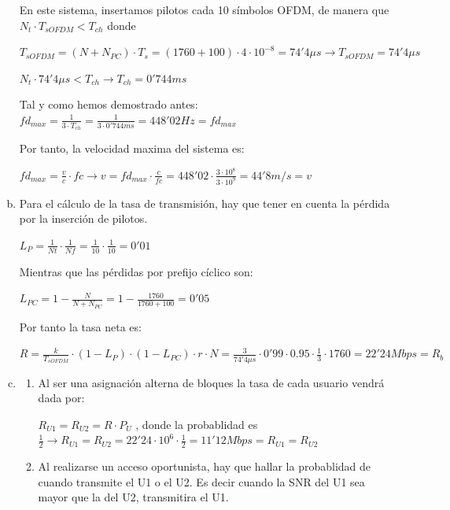 \documentclass[fleqn,14pt]{article}
\begin{document}
\begin{enumerate}[a)]
  En este sistema, insertamos pilotos cada 10 símbolos OFDM, de manera que $N_t \cdot T_{sOFDM} < T_{ch}$ donde

  $T_{sOFDM} = (N + N_{PC}) \cdot T_s = (1760 + 100) \cdot 4 \cdot 10^{-8} = 74'4 \mu s \rightarrow \boxed{T_{sOFDM} = 74'4 \mu s}$

  $N_t \cdot 74'4 \mu s < T_{ch} \rightarrow \boxed{T_{ch} = 0'744 ms}$

  Tal y como hemos demostrado antes: $fd_{max} = \frac{1}{3 \cdot T_{ch}} = \frac{1}{3 \cdot 0'744 ms} = \boxed{448'02 Hz = fd_{max}}$

  Por tanto, la velocidad maxima del sistema es:

  \centering
  $fd_{max} = \frac{v}{c}\cdot fc \rightarrow v = fd_{max} \cdot \frac{c}{fc} = 448'02 \cdot \frac{3\cdot10^{8}}{3\cdot10^{9}} = \boxed{44'8 m/s = v }$

  \raggedright

  \item Para el cálculo de la tasa de transmisión, hay que tener en cuenta la pérdida por la inserción de pilotos.

\centering

$L_P = \frac{1}{Nt} \cdot \frac{1}{Nf} = \frac{1}{10} \cdot \frac{1}{10} = 0'01 $

\raggedright
Mientras que las pérdidas por prefijo cíclico son:
\begin{center}
  $L_{PC} = 1 - \frac{N}{N+N_{PC}} = 1 - \frac{1760}{1760+100} = 0'05$
\end{center}

Por tanto la tasa neta es:
\begin{center}
    $ R = \frac{k}{T_{sOFDM}} \cdot (1-L_P) \cdot (1-L_{PC}) \cdot r \cdot N = \frac{3}{74'4 \mu s} \cdot 0'99 \cdot 0.95 \cdot \frac{1}{3} \cdot 1760 =  \boxed{22'24 Mbps = R_b}$
\end{center}

\item

  \begin{enumerate}[1.]
    \item Al ser una asignación alterna de bloques la tasa de cada usuario vendrá dada por:
    \begin{center}
      $R_{U1} = R_{U2} = R \cdot P_U$ , donde la probablidad es $\frac{1}{2} \rightarrow R_{U1} = R_{U2} = 22'24 \cdot 10^6 \cdot \frac{1}{2} = \boxed{11'12 Mbps = R_{U1} = R_{U2}} $
    \end{center}
    \item Al realizarse un acceso oportunista, hay que hallar la probablidad de cuando transmite el U1 o el U2. Es decir cuando la SNR del U1 sea mayor que la del U2, transmitira el U1.


\end{enumerate}
\end{enumerate}
\end{document}
